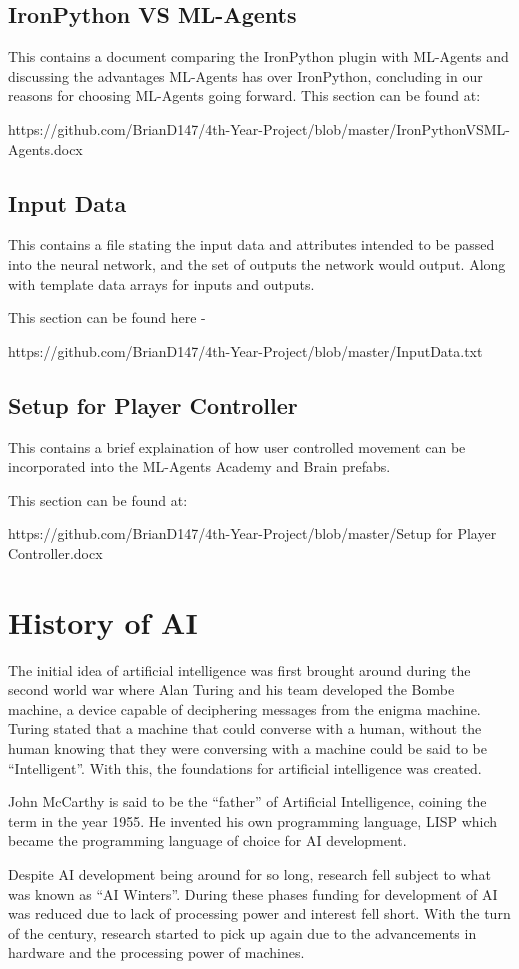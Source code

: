 \subsection{IronPython VS ML-Agents}
This contains a document comparing the IronPython plugin with ML-Agents and discussing the advantages ML-Agents has over IronPython, concluding in our reasons for choosing ML-Agents going forward.
This section can be found at: 

    https://github.com/BrianD147/4th-Year-Project/blob/master/IronPythonVSML-Agents.docx

\subsection{Input Data}
This contains a file stating the input data and attributes intended to be passed into the neural network, and the set of outputs the network would output. Along with template data arrays for inputs and outputs.

This section can be found here - 

    https://github.com/BrianD147/4th-Year-Project/blob/master/InputData.txt


\subsection{Setup for Player Controller}
This contains a brief explaination of how user controlled movement can be incorporated into the ML-Agents Academy and Brain prefabs.

This section can be found at:           

    https://github.com/BrianD147/4th-Year-Project/blob/master/Setup for Player Controller.docx



\section{History of AI}
The initial idea of artificial intelligence was first brought around during the second world war where Alan Turing and his team developed the Bombe machine, a device capable of deciphering messages from the enigma machine. Turing stated that a machine that could converse with a human, without the human knowing that they were conversing with a machine could be said to be “Intelligent”.  With this, the foundations for artificial intelligence was created. 

John McCarthy is said to be the “father” of Artificial Intelligence, coining the term in the year 1955. He invented his own programming language, LISP which became the programming language of choice for AI development. 

Despite AI development being around for so long, research fell subject to what was known as “AI Winters”. During these phases funding for development of AI was reduced due to lack of processing power and interest fell short. With the turn of the century, research started to pick up again due to the advancements in hardware and the processing power of machines.
